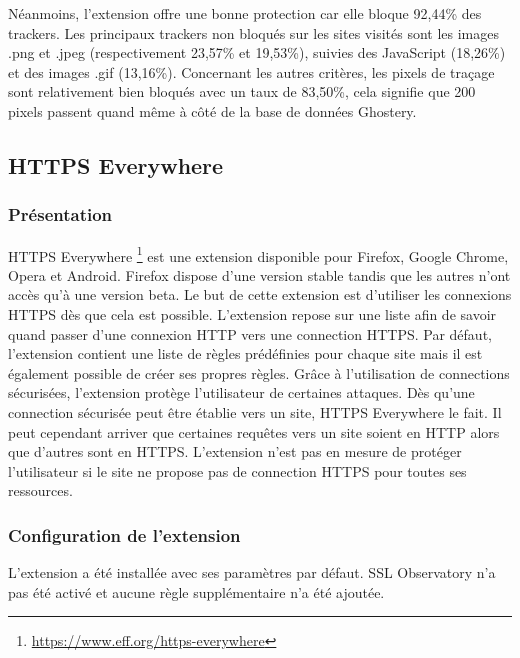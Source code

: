 Néanmoins, l'extension offre une bonne protection car elle bloque 92,44\% des trackers. Les principaux trackers non bloqués sur les sites visités sont les images .png et .jpeg (respectivement 23,57\% et 19,53\%), suivies des JavaScript (18,26\%) et des images .gif (13,16\%).
Concernant les autres critères, les pixels de traçage sont relativement bien bloqués avec un taux de 83,50\%, cela signifie que 200 pixels passent quand même à côté de la base de données Ghostery.

\subsection{HTTPS Everywhere}
\subsubsection{Présentation}
HTTPS Everywhere \footnote{\url{https://www.eff.org/https-everywhere}} est une extension disponible pour Firefox, Google Chrome, Opera et Android. Firefox dispose d'une version stable tandis que les autres n'ont accès qu'à une version beta. Le but de cette extension est d'utiliser les connexions HTTPS dès que cela est possible. L'extension repose sur une liste afin de savoir quand passer d'une connexion HTTP vers une connection HTTPS. Par défaut, l'extension contient une liste de règles prédéfinies pour chaque site mais il est également possible de créer ses propres règles.
Grâce à l'utilisation de connections sécurisées, l'extension protège l'utilisateur de certaines attaques. Dès qu'une connection sécurisée peut être établie vers un site, HTTPS Everywhere le fait. Il peut cependant arriver que certaines requêtes vers un site soient en HTTP alors que d'autres sont en HTTPS. L'extension n'est pas en mesure de protéger l'utilisateur si le site ne propose pas de connection HTTPS pour toutes ses ressources.

\subsubsection{Configuration de l'extension}
L'extension a été installée avec ses paramètres par défaut. SSL Observatory n'a pas été activé et aucune règle supplémentaire n'a été ajoutée.

